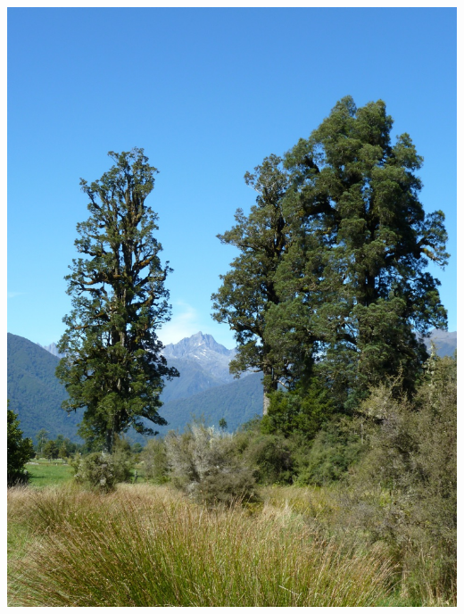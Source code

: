 \begin{frame}
\begin{center}
\begin{minipage}{.45\textwidth}
          \includegraphics[width=\linewidth,angle=180]{img+txt/matheson_baum.jpg}
        \end{minipage}
      \end{center}

    \end{frame}

